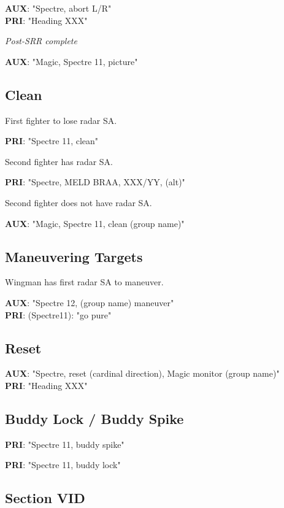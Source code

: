 \textbf{AUX}: "Spectre, abort L/R"\\
\textbf{PRI}: "Heading XXX"

\textit{Post-SRR complete}

\textbf{AUX}: "Magic, Spectre 11, picture"

\subsection*{Clean}

First fighter to lose radar SA.

\textbf{PRI}: "Spectre 11, clean"

Second fighter has radar SA.

\textbf{PRI}: "Spectre, MELD BRAA, XXX/YY, (alt)"

Second fighter does not have radar SA.

\textbf{AUX}: "Magic, Spectre 11, clean (group name)"

\subsection{Maneuvering Targets}

Wingman has first radar SA to maneuver.

\textbf{AUX}: "Spectre 12, (group name) maneuver" \\
\textbf{PRI}: (Spectre11): "go pure"

\subsection*{Reset}

\textbf{AUX}: "Spectre, reset (cardinal direction), Magic monitor (group name)"
\\
\textbf{PRI}: "Heading XXX"

\subsection*{Buddy Lock / Buddy Spike}

\textbf{PRI}: "Spectre 11, buddy spike"

\textbf{PRI}: "Spectre 11, buddy lock"

\newpage

\subsection*{Section VID}

